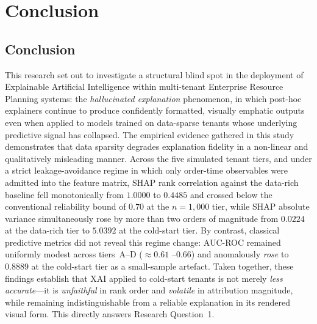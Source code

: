 \chapter{Conclusion}
\label{ch:conclusion}

\section{Conclusion}
\label{sec:conclusion}

This research set out to investigate a structural blind spot in the
deployment of Explainable Artificial Intelligence within multi-tenant
Enterprise Resource Planning systems: the \emph{hallucinated explanation}
phenomenon, in which post-hoc explainers continue to produce confidently
formatted, visually emphatic outputs even when applied to models trained on
data-sparse tenants whose underlying predictive signal has collapsed. The
empirical evidence gathered in this study demonstrates that data sparsity
degrades explanation fidelity in a non-linear and qualitatively misleading
manner. Across the five simulated tenant tiers, and under a strict
leakage-avoidance regime in which only order-time observables were admitted
into the feature matrix, SHAP rank correlation against the data-rich
baseline fell monotonically from $1.0000$ to $0.4485$ and crossed below the
conventional reliability bound of $0.70$ at the $n = 1{,}000$ tier, while
SHAP absolute variance simultaneously rose by more than two orders of
magnitude from $0.0224$ at the data-rich tier to $5.0392$ at the cold-start
tier. By contrast, classical predictive metrics did not reveal this regime
change: AUC-ROC remained uniformly modest across tiers~A--D ($\approx 0.61$
--$0.66$) and anomalously \emph{rose} to $0.8889$ at the cold-start tier
as a small-sample artefact. Taken
together, these findings establish that XAI applied to cold-start tenants
is not merely \emph{less accurate}---it is \emph{unfaithful} in rank order
and \emph{volatile} in attribution magnitude, while remaining
indistinguishable from a reliable explanation in its rendered visual form.
This directly answers Research Question~1.

